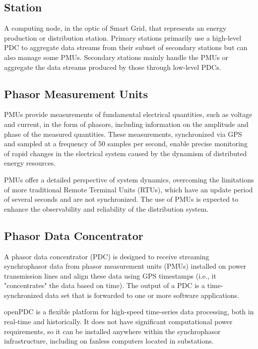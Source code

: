 \subsection{Station}
A computing node, in the optic of Smart Grid, that represents an energy production or distribution station. Primary stations primarily use a high-level PDC to aggregate data streams from their subnet of secondary stations but can also manage some PMUs. Secondary stations mainly handle the PMUs or aggregate the data streams produced by those through low-level PDCs.

\subsection{Phasor Measurement Units}
PMUs provide measurements of fundamental electrical quantities, such as voltage and current, in the form of phasors, including information on the amplitude and phase of the measured quantities. These measurements, synchronized via GPS and sampled at a frequency of 50 samples per second, enable precise monitoring of rapid changes in the electrical system caused by the dynamism of distributed energy resources.

PMUs offer a detailed perspective of system dynamics, overcoming the limitations of more traditional Remote Terminal Units (RTUs), which have an update period of several seconds and are not synchronized. The use of PMUs is expected to enhance the observability and reliability of the distribution system.

\subsection{Phasor Data Concentrator}
A phasor data concentrator (PDC) is designed to receive streaming synchrophasor data from phasor measurement units (PMUs) installed on power transmission lines and align these data using GPS timestamps (i.e., it "concentrates" the data based on time). The output of a PDC is a time-synchronized data set that is forwarded to one or more software applications.

openPDC is a flexible platform for high-speed time-series data processing, both in real-time and historically. It does not have significant computational power requirements, so it can be installed anywhere within the synchrophasor infrastructure, including on fanless computers located in substations.


